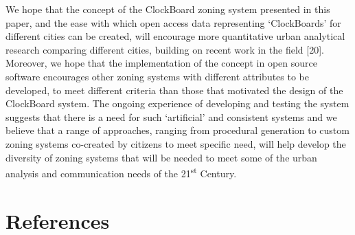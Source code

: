 \documentclass{josis}
\begin{document}
We hope that the concept of the ClockBoard zoning system presented in this paper, and the ease with which open access data representing `ClockBoards' for different cities can be created, will encourage more quantitative urban analytical research comparing different cities, building on recent work in the field {[}20{]}.
Moreover, we hope that the implementation of the concept in open source software encourages other zoning systems with different attributes to be developed, to meet different criteria than those that motivated the design of the ClockBoard system.
The ongoing experience of developing and testing the system suggests that there is a need for such `artificial' and consistent systems and we believe that a range of approaches, ranging from procedural generation to custom zoning systems co-created by citizens to meet specific need, will help develop the diversity of zoning systems that will be needed to meet some of the urban analysis and communication needs of the 21\textsuperscript{st} Century.

\hypertarget{references}{%
\section*{References}\label{references}}
\end{document}
